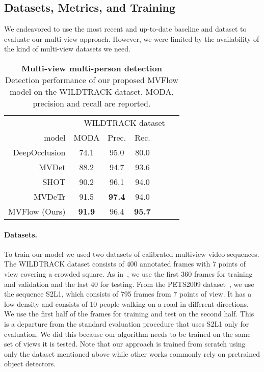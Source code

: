\documentclass[10pt,twocolumn,letterpaper]{article}
\begin{document}
%
 


\subsection{Datasets, Metrics, and Training}

We endeavored to use the most recent and up-to-date baseline and dataset to evaluate our multi-view approach. However, we were limited by the availability of the kind of multi-view datasets we need.

\begin{table}[h]
    \begin{center}
    \begin{tabular}{r  c c c   c c c } \toprule
    

    &  \multicolumn{6}{c}{WILDTRACK dataset}  \\ \cmidrule(lr{.75em}){2-7}
    model & MODA & Prec. & Rec.  \\ \midrule
    DeepOcclusion \cite{Chavdarova18a} & 74.1 & 95.0 & 80.0 \\
    MVDet \cite{hou2020multiview} & 88.2 & 94.7 & 93.6   \\
    SHOT \cite{song2021stacked} & 90.2 & 96.1 & 94.0   \\
    MVDeTr \cite{hou2021multiview} & 91.5 & \textbf{97.4} & 94.0   \\
    MVFlow (Ours) & \textbf{91.9} & 96.4 & \textbf{95.7}  \\
    \bottomrule
    \end{tabular}
    \end{center}
      \caption{\textbf{Multi-view multi-person detection}  Detection performance of our proposed MVFlow model on the WILDTRACK dataset. MODA, precision and recall are reported.
      }  
     \label{tab:mvmdetection}
    \end{table} 
\paragraph{Datasets.}

To train our model we used two datasets of calibrated multiview video sequences. The WILDTRACK dataset \cite{Chavdarova18a} consists of 400 annotated frames with 7 points of view covering a crowded square. As in~\cite{Chavdarova18a}, we use the first 360 frames for training and validation and the last 40 for testing. From the PETS2009 dataset~\cite{Ferryman09a}, we use the sequence S2L1, which consists of 795 frames from 7 points of view. It has a low density and consists of 10 people walking on a road in different directions. We use the first half of the frames for training and test on the second half. This is a departure from the standard evaluation procedure that uses S2L1 only for evaluation. We did this because our algorithm needs to be trained on the same set of views it is tested. Note that our approach is trained from scratch using only the dataset mentioned above while other works commonly rely on pretrained object detectors.
\end{document}

